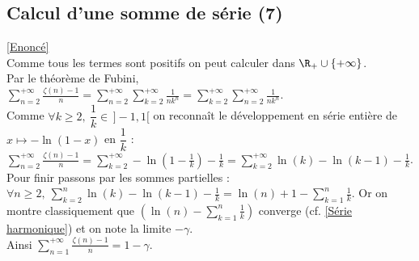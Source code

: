\documentclass{book}
\begin{document}
	\subsection{Calcul d'une somme de série (7) }
	\label{Calcul d'une somme de série (7) corrigé}
	\textcolor{blue}{\hyperref[Calcul d'une somme de série (7)]{[Enoncé]}}\\
	Comme tous les termes sont positifs on peut calculer dans $\R_+\cup\{+\infty\}$.\\
	Par le théorème de Fubini, $\displaystyle\sum_{n=2}^{+\infty}\frac{\zeta(n)-1}{n}=\sum_{n=2}^{+\infty}\sum_{k=2}^{+\infty}\frac{1}{nk^n}=\sum_{k=2}^{+\infty}\sum_{n=2}^{+\infty}\frac{1}{nk^n}$.\\
	Comme $\forall k\geq 2,\ \dfrac{1}{k}\in\, ]-1,1[$ on reconnaît le développement en série entière de $x\mapsto -\ln(1-x)$ en $\dfrac{1}{k}$ :\\
	$\displaystyle \sum_{n=2}^{+\infty}\frac{\zeta(n)-1}{n}=\sum_{k=2}^{+\infty}-\ln\left(1-\frac{1}{k}\right)-\frac{1}{k}=\sum_{k=2}^{+\infty}\ln(k)-\ln(k-1)-\frac{1}{k}$.\\
	Pour finir passons par les sommes partielles :\\
	$\forall n\geq 2,\ \displaystyle\sum_{k=2}^n\ln(k)-\ln(k-1)-\frac{1}{k}=\ln(n)+1-\sum_{k=1}^n\frac{1}{k}$. Or on montre classiquement que $\left(\displaystyle\ln(n)-\sum_{k=1}^n\frac{1}{k}\right)$ converge (cf. \ref{Série harmonique}) et on note la limite $-\gamma$.\\
	Ainsi $\displaystyle\sum_{n=1}^{+\infty}\frac{\zeta(n)-1}{n}=1-\gamma$.
	
\end{document}

